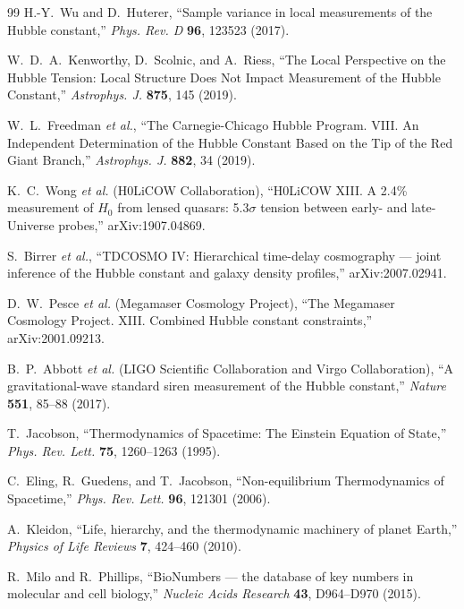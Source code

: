 \documentclass[10pt]{article}
\begin{document}
\begin{thebibliography}{99}
H.-Y.~Wu and D.~Huterer,
``Sample variance in local measurements of the Hubble constant,''
\emph{Phys. Rev. D} \textbf{96}, 123523 (2017).

W.~D.~A.~Kenworthy, D.~Scolnic, and A.~Riess,
``The Local Perspective on the Hubble Tension: Local Structure Does Not Impact Measurement of the
Hubble Constant,''
\emph{Astrophys. J.} \textbf{875}, 145 (2019).

W.~L.~Freedman \emph{et al.},
``The Carnegie-Chicago Hubble Program. VIII. An Independent Determination of the Hubble Constant
Based on the Tip of the Red Giant Branch,''
\emph{Astrophys. J.} \textbf{882}, 34 (2019).

K.~C.~Wong \emph{et al.} (H0LiCOW Collaboration),
``H0LiCOW XIII. A 2.4\% measurement of $H_0$ from lensed quasars: 5.3$\sigma$ tension between early-
and late-Universe probes,''
arXiv:1907.04869.

S.~Birrer \emph{et al.},
``TDCOSMO IV: Hierarchical time-delay cosmography --- joint inference of the Hubble constant and
galaxy density profiles,''
arXiv:2007.02941.

D.~W.~Pesce \emph{et al.} (Megamaser Cosmology Project),
``The Megamaser Cosmology Project. XIII. Combined Hubble constant constraints,''
arXiv:2001.09213.

B.~P.~Abbott \emph{et al.} (LIGO Scientific Collaboration and Virgo Collaboration),
``A gravitational-wave standard siren measurement of the Hubble constant,''
\emph{Nature} \textbf{551}, 85--88 (2017).

T.~Jacobson,
``Thermodynamics of Spacetime: The Einstein Equation of State,''
\emph{Phys. Rev. Lett.} \textbf{75}, 1260--1263 (1995).

C.~Eling, R.~Guedens, and T.~Jacobson,
``Non-equilibrium Thermodynamics of Spacetime,''
\emph{Phys. Rev. Lett.} \textbf{96}, 121301 (2006).

A.~Kleidon,
``Life, hierarchy, and the thermodynamic machinery of planet Earth,''
\emph{Physics of Life Reviews} \textbf{7}, 424--460 (2010).

R.~Milo and R.~Phillips,
``BioNumbers --- the database of key numbers in molecular and cell biology,''
\emph{Nucleic Acids Research} \textbf{43}, D964--D970 (2015).


\end{thebibliography}
\end{document}
